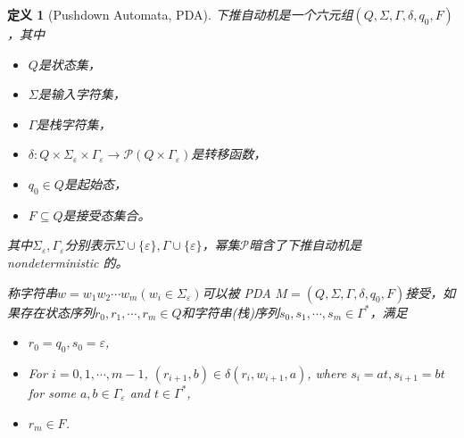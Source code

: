 \documentclass[8pt]{article}
\theoremstyle{compact}
\newtheorem{definition}{定义}
\begin{document}
\begin{definition}[Pushdown Automata, PDA]
	下推自动机是一个六元组$(Q, \Sigma, \Gamma, \delta, q_0, F)$，其中
	\begin{itemize}
		\item $Q$是状态集，
		\item $\Sigma$是输入字符集，
		\item $\Gamma$是栈字符集，
		\item $\delta: Q \times \Sigma_{\varepsilon} \times \Gamma_{\varepsilon} \to \mathcal P(Q \times \Gamma_{\varepsilon})$是转移函数，
		\item $q_0 \in Q$是起始态，
		\item $F \subseteq Q$是接受态集合。
	\end{itemize}

	其中$\Sigma_{\varepsilon}, \Gamma_{\varepsilon}$分别表示$\Sigma \cup \{\varepsilon\}, \Gamma \cup \{\varepsilon\}$，幂集$\mathcal P$暗含了下推自动机是 nondeterministic 的。

	称字符串$w = w_1w_2\cdots w_m(w_i \in \Sigma_{\varepsilon})$可以被 PDA $M = (Q, \Sigma, \Gamma, \delta, q_0, F)$接受，如果存在状态序列$r_0, r_1, \cdots, r_m \in Q$和字符串(栈)序列$s_0, s_1, \cdots, s_m \in \Gamma^*$，满足
	\begin{itemize}
		\item $r_0 = q_0, s_0 = \varepsilon$,
		\item For $i = 0, 1, \cdots, m-1$, $(r_{i+1}, b) \in \delta(r_i, w_{i+1}, a)$, where $s_i = at, s_{i+1}=bt$ for some $a, b \in \Gamma_{\varepsilon}$ and $t \in \Gamma^*$,
		\item $r_m \in F$.
	\end{itemize}
\end{definition}
\end{document}
